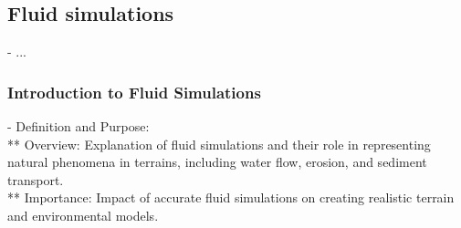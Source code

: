 
\subsection{Fluid simulations}
- ... 
\subsubsection{Introduction to Fluid Simulations}
- Definition and Purpose: \\
** Overview: Explanation of fluid simulations and their role in representing natural phenomena in terrains, including water flow, erosion, and sediment transport. \\
** Importance: Impact of accurate fluid simulations on creating realistic terrain and environmental models.\\
